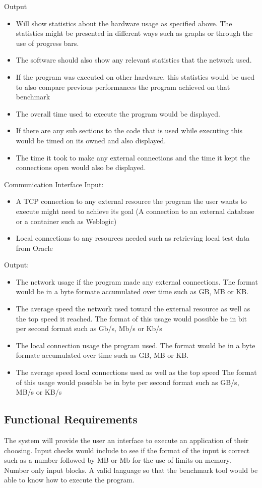 \documentclass[a4paper,12pt]{article}
\begin{document}
Output
\begin{itemize}
\item Will show statistics about the hardware usage as specified above. The statistics might be presented in different ways such as graphs or through the use of progress bars. 
\item The software should also show any relevant statistics that the network used. 
\item If the program was executed on other hardware, this statistics would be used to also compare previous performances the program achieved on that benchmark
\item The overall time used to execute the program would be displayed.
\item If there are any sub sections to the code that is used while executing this would be timed on its owned and also displayed.
\item The time it took to make any external connections and the time it kept the connections open would also be displayed.  
\end{itemize}
Communication Interface
Input:
\begin{itemize}
\item A TCP connection to any external resource the program the user wants to execute might need to achieve its goal (A connection to an external database or a container such as Weblogic) 
\item Local connections to any resources needed such as retrieving local test data from Oracle
\end{itemize}
Output:
\begin{itemize}
\item The network usage if the program made any external connections. The format would be in a byte formate accumulated over time such as GB, MB or KB.
\item The average speed the network used toward the external resource as well as the top speed it reached. The format of this usage would possible be in bit per second format such as Gb/s, Mb/s or Kb/s 
\item The local connection usage the program used. The format would be in a byte formate accumulated over time such as GB, MB or KB.
\item The average speed local connections used as well as the top speed The format of this usage would possible be in byte per second format such as GB/s, MB/s or KB/s 
\end{itemize}


\subsection{Functional Requirements}
 The system will provide the user an interface to execute an application of their choosing. Input checks would include to see if the format of the input is correct such as a number followed by MB or Mb for the use of limits on memory. Number only input blocks. A valid language so that the benchmark tool would be able to know how to execute the program. 
 
\end{document}
